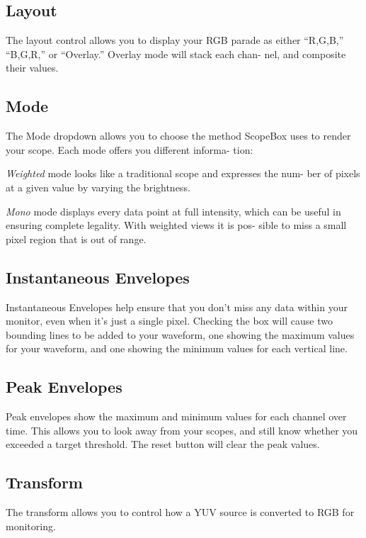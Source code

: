 \documentclass[10,letterpaper,]{report}
\begin{document}
\subsection{Layout}

The layout control allows you to display your RGB parade as either
``R,G,B,'' ``B,G,R,'' or ``Overlay.'' Overlay mode will stack each chan-
nel, and composite their values.

\subsection{Mode}

The Mode dropdown allows you to choose the method ScopeBox uses to
render your scope. Each mode offers you different informa- tion:

\emph{Weighted} mode looks like a traditional scope and expresses the
num- ber of pixels at a given value by varying the brightness.

\emph{Mono} mode displays every data point at full intensity, which can
be useful in ensuring complete legality. With weighted views it is pos-
sible to miss a small pixel region that is out of range.

\subsection{Instantaneous Envelopes}

Instantaneous Envelopes help ensure that you don't miss any data within
your monitor, even when it's just a single pixel. Checking the box will
cause two bounding lines to be added to your waveform, one showing the
maximum values for your waveform, and one showing the minimum values for
each vertical line.

\subsection{Peak Envelopes}

Peak envelopes show the maximum and minimum values for each channel over
time. This allows you to look away from your scopes, and still know
whether you exceeded a target threshold. The reset button will clear the
peak values.

\subsection{Transform}

The transform allows you to control how a YUV source is converted to RGB
for monitoring.
\end{document}
